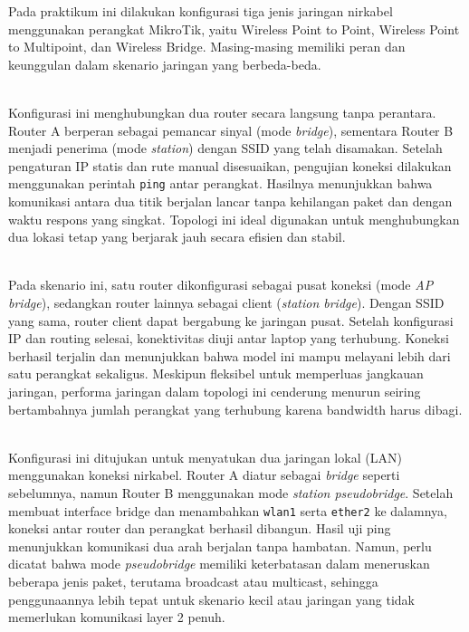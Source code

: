 Pada praktikum ini dilakukan konfigurasi tiga jenis jaringan nirkabel menggunakan perangkat MikroTik, yaitu Wireless Point to Point, Wireless Point to Multipoint, dan Wireless Bridge. Masing-masing memiliki peran dan keunggulan dalam skenario jaringan yang berbeda-beda.

\\

Konfigurasi ini menghubungkan dua router secara langsung tanpa perantara. Router A berperan sebagai pemancar sinyal (mode \textit{bridge}), sementara Router B menjadi penerima (mode \textit{station}) dengan SSID yang telah disamakan. Setelah pengaturan IP statis dan rute manual disesuaikan, pengujian koneksi dilakukan menggunakan perintah \texttt{ping} antar perangkat. Hasilnya menunjukkan bahwa komunikasi antara dua titik berjalan lancar tanpa kehilangan paket dan dengan waktu respons yang singkat. Topologi ini ideal digunakan untuk menghubungkan dua lokasi tetap yang berjarak jauh secara efisien dan stabil.

\\

Pada skenario ini, satu router dikonfigurasi sebagai pusat koneksi (mode \textit{AP bridge}), sedangkan router lainnya sebagai client (\textit{station bridge}). Dengan SSID yang sama, router client dapat bergabung ke jaringan pusat. Setelah konfigurasi IP dan routing selesai, konektivitas diuji antar laptop yang terhubung. Koneksi berhasil terjalin dan menunjukkan bahwa model ini mampu melayani lebih dari satu perangkat sekaligus. Meskipun fleksibel untuk memperluas jangkauan jaringan, performa jaringan dalam topologi ini cenderung menurun seiring bertambahnya jumlah perangkat yang terhubung karena bandwidth harus dibagi.

\\

Konfigurasi ini ditujukan untuk menyatukan dua jaringan lokal (LAN) menggunakan koneksi nirkabel. Router A diatur sebagai \textit{bridge} seperti sebelumnya, namun Router B menggunakan mode \textit{station pseudobridge}. Setelah membuat interface bridge dan menambahkan \texttt{wlan1} serta \texttt{ether2} ke dalamnya, koneksi antar router dan perangkat berhasil dibangun. Hasil uji ping menunjukkan komunikasi dua arah berjalan tanpa hambatan. Namun, perlu dicatat bahwa mode \textit{pseudobridge} memiliki keterbatasan dalam meneruskan beberapa jenis paket, terutama broadcast atau multicast, sehingga penggunaannya lebih tepat untuk skenario kecil atau jaringan yang tidak memerlukan komunikasi layer 2 penuh.

